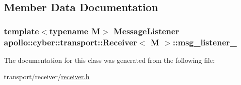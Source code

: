 \subsection{Member Data Documentation}
\hypertarget{classapollo_1_1cyber_1_1transport_1_1Receiver_a89ce9185e2eabed8eb189d7917fdb746}{
\subsubsection[{msg\-\_\-listener\-\_\-}]{\setlength{\rightskip}{0pt plus 5cm}template$<$typename M$>$ {\bf Message\-Listener} {\bf apollo\-::cyber\-::transport\-::\-Receiver}$<$ M $>$\-::msg\-\_\-listener\-\_\-\hspace{0.3cm}{\ttfamily [protected]}}}\label{classapollo_1_1cyber_1_1transport_1_1Receiver_a89ce9185e2eabed8eb189d7917fdb746}


The documentation for this class was generated from the following file\-:\begin{DoxyCompactItemize}
\item 
transport/receiver/\hyperlink{receiver_8h}{receiver.\-h}\end{DoxyCompactItemize}
